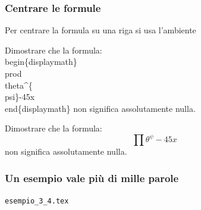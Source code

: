 \documentclass[svgnames,%
	ucs,%
	pdftex]{guitbeamer}
\begin{document}
\begin{frame}
  \frametitle{Centrare le formule}
	Per centrare la formula su una riga si usa l'ambiente  
	\begin{LaTeXcode}
	Dimostrare che la formula:\n
		\alert{\\begin\{displaymath\}}\n
			\hspace*{5ex}\\prod\\theta\textasciicircum\{\\psi\}-45x\n
		\alert{\\end\{displaymath\}}\n
	non significa assolutamente nulla.
	\end{LaTeXcode}
	\begin{LaTeXoutput}
	Dimostrare che la formula:
		\begin{displaymath}
			\prod\theta^{\psi}-45x 
		\end{displaymath} 
	non significa assolutamente nulla.
	\end{LaTeXoutput}
\end{frame}
\begin{frame}
  \frametitle{Un esempio vale pi\`u di mille parole}
	\begin{center}
		\alert{\texttt{esempio\_3\_4.tex}}
	\end{center}
\end{frame}
\end{document}
